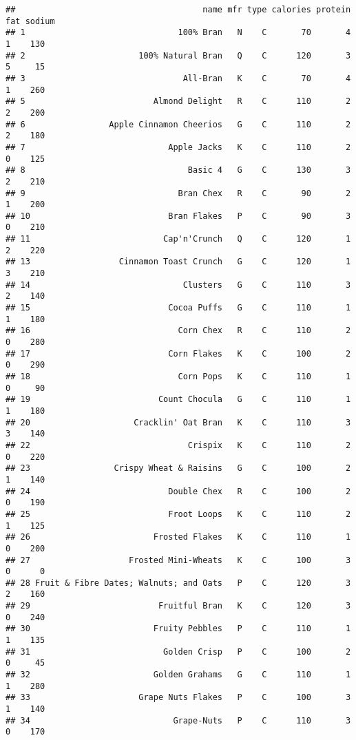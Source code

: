 \documentclass[
]{article}
\begin{document}
\begin{verbatim}
##                                      name mfr type calories protein fat sodium
## 1                               100% Bran   N    C       70       4   1    130
## 2                       100% Natural Bran   Q    C      120       3   5     15
## 3                                All-Bran   K    C       70       4   1    260
## 5                          Almond Delight   R    C      110       2   2    200
## 6                 Apple Cinnamon Cheerios   G    C      110       2   2    180
## 7                             Apple Jacks   K    C      110       2   0    125
## 8                                 Basic 4   G    C      130       3   2    210
## 9                               Bran Chex   R    C       90       2   1    200
## 10                            Bran Flakes   P    C       90       3   0    210
## 11                           Cap'n'Crunch   Q    C      120       1   2    220
## 13                  Cinnamon Toast Crunch   G    C      120       1   3    210
## 14                               Clusters   G    C      110       3   2    140
## 15                            Cocoa Puffs   G    C      110       1   1    180
## 16                              Corn Chex   R    C      110       2   0    280
## 17                            Corn Flakes   K    C      100       2   0    290
## 18                              Corn Pops   K    C      110       1   0     90
## 19                          Count Chocula   G    C      110       1   1    180
## 20                     Cracklin' Oat Bran   K    C      110       3   3    140
## 22                                Crispix   K    C      110       2   0    220
## 23                 Crispy Wheat & Raisins   G    C      100       2   1    140
## 24                            Double Chex   R    C      100       2   0    190
## 25                            Froot Loops   K    C      110       2   1    125
## 26                         Frosted Flakes   K    C      110       1   0    200
## 27                    Frosted Mini-Wheats   K    C      100       3   0      0
## 28 Fruit & Fibre Dates; Walnuts; and Oats   P    C      120       3   2    160
## 29                          Fruitful Bran   K    C      120       3   0    240
## 30                         Fruity Pebbles   P    C      110       1   1    135
## 31                           Golden Crisp   P    C      100       2   0     45
## 32                         Golden Grahams   G    C      110       1   1    280
## 33                      Grape Nuts Flakes   P    C      100       3   1    140
## 34                             Grape-Nuts   P    C      110       3   0    170

\end{verbatim}
\end{document}
